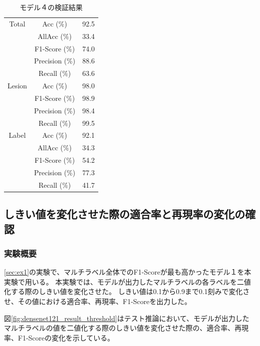 \begin{table}[tb]
    \caption[]{モデル４の検証結果}
    \label{tb:densenet161_e}
    \centering
    \normalsize
    \begin{tabular}{c|c|r} \hline
        Total & Acc (\%) & 92.5 \\ \cline{2-3}
         & AllAcc (\%) & 33.4 \\ \cline{2-3}
         & F1-Score (\%) & 74.0 \\ \cline{2-3}
         & Precision (\%) & 88.6 \\ \cline{2-3}
         & Recall (\%) & 63.6 \\ \hline
        Lesion & Acc (\%) & 98.0 \\ \cline{2-3}
         & F1-Score (\%) & 98.9 \\ \cline{2-3}
         & Precision (\%) & 98.4 \\ \cline{2-3}
         & Recall (\%) & 99.5 \\ \hline
        Label & Acc (\%) & 92.1 \\ \cline{2-3}
         & AllAcc (\%) & 34.3 \\ \cline{2-3}
         & F1-Score (\%) & 54.2 \\ \cline{2-3}
         & Precision (\%) & 77.3 \\ \cline{2-3}
         & Recall (\%) & 41.7 \\ \hline
    \end{tabular}
\end{table}

\newpage
\subsection{しきい値を変化させた際の適合率と再現率の変化の確認}
\label{sec:ex11}
\subsubsection{実験概要}
\ref{sec:ex1}の実験で、マルチラベル全体でのF1-Scoreが最も高かったモデル１を本実験で用いる。
本実験では、モデルが出力したマルチラベルの各ラベルを二値化する際のしきい値を変化させた。
しきい値は0.1から0.9まで0.1刻みで変化させ、その値における適合率、再現率、F1-Scoreを出力した。

図\ref{fig:densenet121_result_threshold}はテスト推論において、モデルが出力したマルチラベルの値を二値化する際のしきい値を変化させた際の、適合率、再現率、F1-Scoreの変化を示している。

